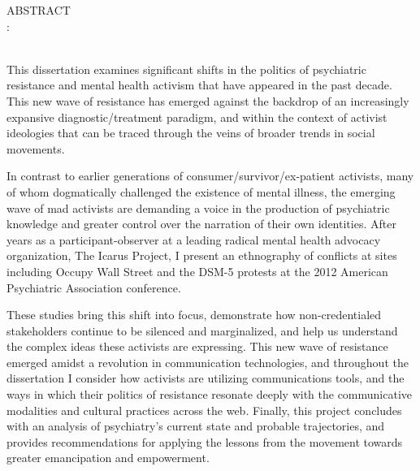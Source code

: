 %
	\tgherosfont

        \begin{center}
	        ABSTRACT \\[0.15in]

               	{\thesisTitle}: {\thesisSubtitle} \\[0.15in]
	        {\thesisName} \\[0.15in]

        \end{center}

\noindent
This dissertation examines significant shifts in the politics of psychiatric resistance and mental health activism that have appeared in the past decade. This new wave of resistance has emerged against the backdrop of an increasingly expansive diagnostic/treatment paradigm, and within the context of activist ideologies that can be traced through the veins of broader trends in social movements.

In contrast to earlier generations of consumer/survivor/ex-patient activists, many of whom dogmatically challenged the existence of mental illness, the emerging wave of mad activists are demanding a voice in the production of psychiatric knowledge and greater control over the narration of their own identities. After years as a participant-observer at a leading radical mental health advocacy organization, The Icarus Project, I present an ethnography of conflicts at sites including Occupy Wall Street and the DSM-5 protests at the 2012 American Psychiatric Association conference.

These studies bring this shift into focus, demonstrate how non-credentialed stakeholders continue to be silenced and marginalized, and help us understand the complex ideas these activists are expressing. This new wave of resistance emerged amidst a revolution in communication technologies, and throughout the dissertation I consider how activists are utilizing communications tools, and the ways in which their politics of resistance resonate deeply with the communicative modalities and cultural practices across the web. Finally, this project concludes with an analysis of psychiatry’s current state and probable trajectories, and provides recommendations for applying the lessons from the movement towards greater emancipation and empowerment.



